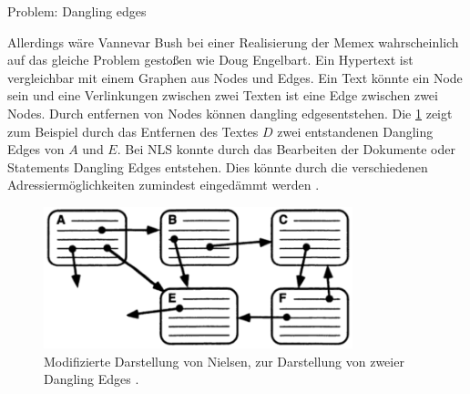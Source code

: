\begin{section}{Problem: Dangling edges}
\label{sec:dangling}

Allerdings wäre Vannevar Bush bei einer Realisierung der Memex wahrscheinlich auf das gleiche Problem gestoßen wie Doug Engelbart. Ein Hypertext ist vergleichbar mit einem Graphen aus Nodes und Edges. Ein Text könnte ein Node sein und eine Verlinkungen zwischen zwei Texten ist eine Edge zwischen zwei Nodes. Durch entfernen von Nodes können \glqq dangling edges\grqq{ }entstehen. Die \ref{fig:dangle} zeigt zum Beispiel durch das Entfernen des Textes $D$ zwei entstandenen Dangling Edges von $A$ und $E$. Bei NLS konnte durch das Bearbeiten der Dokumente oder Statements Dangling Edges entstehen. Dies könnte durch die verschiedenen Adressiermöglichkeiten zumindest eingedämmt werden \cite{Engelbart1984}.

\begin{figure}[!ht]
	\centering
	\includegraphics[width=0.8\textwidth]{image/dangle}
	\caption{Modifizierte Darstellung von Nielsen, zur Darstellung von zweier Dangling Edges \cite[S.1]{Nielsen1995}.}
	\label{fig:dangle}
\end{figure}

\end{section}

